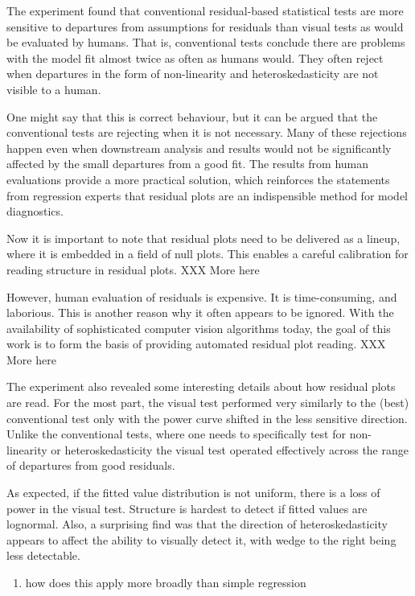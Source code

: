 \documentclass[]{interact}
\theoremstyle{plain}%
\theoremstyle{definition}
\theoremstyle{remark}
\providecommand{\tightlist}{%
  \setlength{\itemsep}{0pt}\setlength{\parskip}{0pt}}
\def\tightlist{}
\begin{document}
The experiment found that conventional residual-based statistical tests
are more sensitive to departures from assumptions for residuals than
visual tests as would be evaluated by humans. That is, conventional
tests conclude there are problems with the model fit almost twice as
often as humans would. They often reject when departures in the form of
non-linearity and heteroskedasticity are not visible to a human.

One might say that this is correct behaviour, but it can be argued that
the conventional tests are rejecting when it is not necessary. Many of
these rejections happen even when downstream analysis and results would
not be significantly affected by the small departures from a good fit.
The results from human evaluations provide a more practical solution,
which reinforces the statements from regression experts that residual
plots are an indispensible method for model diagnostics.

Now it is important to note that residual plots need to be delivered as
a lineup, where it is embedded in a field of null plots. This enables a
careful calibration for reading structure in residual plots. XXX More
here

However, human evaluation of residuals is expensive. It is
time-consuming, and laborious. This is another reason why it often
appears to be ignored. With the availability of sophisticated computer
vision algorithms today, the goal of this work is to form the basis of
providing automated residual plot reading. XXX More here

The experiment also revealed some interesting details about how residual
plots are read. For the most part, the visual test performed very
similarly to the (best) conventional test only with the power curve
shifted in the less sensitive direction. Unlike the conventional tests,
where one needs to specifically test for non-linearity or
heteroskedasticity the visual test operated effectively across the range
of departures from good residuals.

As expected, if the fitted value distribution is not uniform, there is a
loss of power in the visual test. Structure is hardest to detect if
fitted values are lognormal. Also, a surprising find was that the
direction of heteroskedasticity appears to affect the ability to
visually detect it, with wedge to the right being less detectable.

\begin{enumerate}
\def\labelenumi{\arabic{enumi}.}
\setcounter{enumi}{2}
\tightlist
\item
  how does this apply more broadly than simple regression
\end{enumerate}
\end{document}
